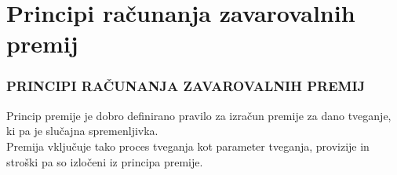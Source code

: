 \documentclass{beamer}
\begin{document}
\section{Principi računanja zavarovalnih premij}
\begin{frame}
	\frametitle{PRINCIPI RAČUNANJA ZAVAROVALNIH PREMIJ}
	Princip premije je dobro definirano pravilo za izračun premije za dano tveganje, ki pa je slučajna spremenljivka. \\
	\vspace{0.5cm}
	Premija vključuje tako proces tveganja kot parameter tveganja, provizije in stroški pa so izločeni iz principa premije.
\end{frame}
\end{document}
